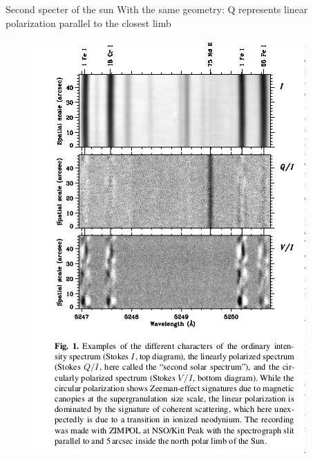 \documentclass{beamer}
\begin{document}
\begin{frame}{Second specter of the sun}
With the same geometry: Q represents linear polarization parallel to the closest limb
\begin{figure}[H]
 \centering
 \includegraphics[scale=0.5]{a3.png}
\end{figure}
\end{frame}
\end{document}
